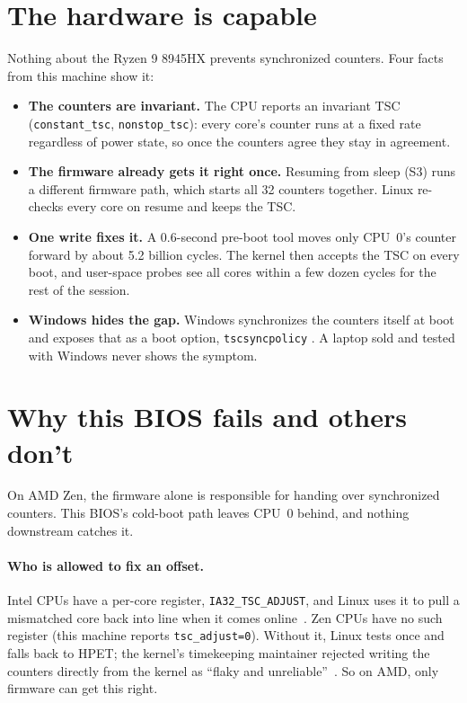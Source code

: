 \documentclass[11pt,a4paper]{article}
\newcommand{\code}[1]{\texttt{#1}}
\begin{document}
\section{The hardware is capable}

Nothing about the Ryzen 9 8945HX prevents synchronized counters. Four facts
from this machine show it:
\begin{itemize}
\item \textbf{The counters are invariant.} The CPU reports an invariant TSC
  (\code{constant\_tsc}, \code{nonstop\_tsc}): every core's counter runs at a
  fixed rate regardless of power state, so once the counters agree they stay
  in agreement.
\item \textbf{The firmware already gets it right once.} Resuming from sleep
  (S3) runs a different firmware path, which starts all 32 counters together.
  Linux re-checks every core on resume and keeps the TSC.
\item \textbf{One write fixes it.} A 0.6-second pre-boot tool moves only
  CPU~0's counter forward by about 5.2 billion cycles. The kernel then accepts
  the TSC on every boot, and user-space probes see all cores within a few
  dozen cycles for the rest of the session.
\item \textbf{Windows hides the gap.} Windows synchronizes the counters itself
  at boot and exposes that as a boot option, \code{tscsyncpolicy}
  \cite{bcdedit}. A laptop sold and tested with Windows never shows the
  symptom.
\end{itemize}

\section{Why this BIOS fails and others don't}

On AMD Zen, the firmware alone is responsible for handing over synchronized
counters. This BIOS's cold-boot path leaves CPU~0 behind, and nothing
downstream catches it.

\paragraph{Who is allowed to fix an offset.} Intel CPUs have a per-core
register, \code{IA32\_TSC\_ADJUST}, and Linux uses it to pull a mismatched
core back into line when it comes online~\cite{tscsync-c}. Zen CPUs have no
such register (this machine reports \code{tsc\_adjust=0}). Without it, Linux
tests once and falls back to HPET; the kernel's timekeeping maintainer
rejected writing the counters directly from the kernel as ``flaky and
unreliable''~\cite{lkml}. So on AMD, only firmware can get this right.
\end{document}
